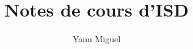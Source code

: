 \documentclass[12pt, a4paper]{article}
\title{Notes de cours d'ISD}
\author{Yann Miguel}
\begin{document}
\ttfamily
\maketitle
\tableofcontents
\newpage



%
%
%
%

\end{document}
